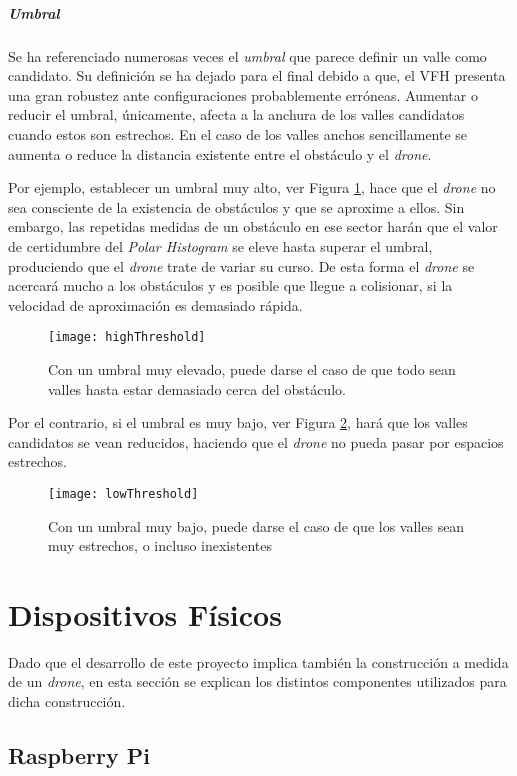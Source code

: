 \subparagraph{Umbral}
Se ha referenciado numerosas veces el \textit{umbral} que parece definir un valle como candidato. Su definición se ha dejado para el final debido a que, el VFH presenta una gran robustez ante configuraciones probablemente erróneas. Aumentar o reducir el umbral, únicamente, afecta a la anchura de los valles candidatos cuando estos son estrechos. En el caso de los valles anchos sencillamente se aumenta o reduce la distancia existente entre el obstáculo y el \emph{drone}.

Por ejemplo, establecer un umbral muy alto, ver Figura \ref{fig:highThreshold}, hace que el \emph{drone} no sea consciente de la existencia de obstáculos y que se aproxime a ellos. Sin embargo, las repetidas medidas de un obstáculo en ese sector harán que el valor de certidumbre del \emph{Polar Histogram} se eleve hasta superar el umbral, produciendo que el \emph{drone} trate de variar su curso. De esta forma el \emph{drone} se acercará mucho a los obstáculos y es posible que llegue a colisionar, si la velocidad de aproximación es demasiado rápida. 
 \begin{figure}[H]
	\centering
	\texttt{[image: highThreshold]}
	\caption[Umbral elevado.]{Con un umbral muy elevado, puede darse el caso de que todo sean valles hasta estar demasiado cerca del obstáculo.}\label{fig:highThreshold}
\end{figure}

Por el contrario, si el umbral es muy bajo, ver Figura \ref{fig:lowThreshold}, hará que los valles candidatos se vean reducidos, haciendo que el \emph{drone} no pueda pasar por espacios estrechos.
 \begin{figure}[H]
	\centering
	\texttt{[image: lowThreshold]}
	\caption[Umbral bajo.]{Con un umbral muy bajo, puede darse el caso de que los valles sean muy estrechos, o incluso inexistentes}\label{fig:lowThreshold}
\end{figure}



\section{Dispositivos Físicos}

Dado que el desarrollo de este proyecto implica también la construcción a medida de un \emph{drone}, en esta sección se explican los distintos componentes utilizados para dicha construcción. 

\subsection{Raspberry Pi}

